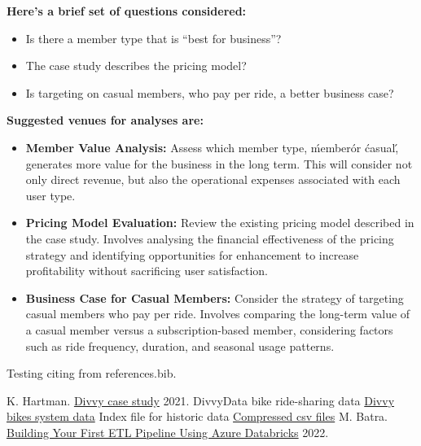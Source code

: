 \documentclass[12pt, a4paper]{article}
\begin{document}
    \textbf{Here's a brief set of questions considered:}
    \begin{itemize}
        \item Is there a member type that is “best for business”?
        \item The case study describes the pricing model?
        \item Is targeting on casual members, who pay per ride, a better business case?
    \end{itemize}
    \textbf{Suggested venues for analyses are:}
    \begin{itemize}
        \item \textbf{Member Value Analysis:} Assess which member type, \'member\' or \'casual\', generates more value for the business in the long term. This will consider not only direct revenue, but also the operational expenses associated with each user type.
        \item \textbf{Pricing Model Evaluation:} Review the existing pricing model described in the case study. Involves analysing the financial effectiveness of the pricing strategy and identifying opportunities for enhancement to increase profitability without sacrificing user satisfaction.
        \item \textbf{Business Case for Casual Members:} Consider the strategy of targeting casual members who pay per ride. Involves comparing the long-term value of a casual member versus a subscription-based member, considering factors such as ride frequency, duration, and seasonal usage patterns.
    \end{itemize}
    Testing citing from references.bib\cite{DataAnalytics2023}.

    \begin{thebibliography}{9}
         K. Hartman. \href{https://artscience.blog/home/divvy-dataviz-case-study}{Divvy case study}\/  2021.
         DivvyData bike ride-sharing data \href{https://divvybikes.com/system-data}{Divvy bikes system data}\/
         Index file for historic data \href{https://divvy-tripdata.s3.amazonaws.com/index.html}{Compressed csv files}\/
         M. Batra. \href{https://app.pluralsight.com/library/courses/building-etl-pipeline-microsoft-azure-databricks/table-of-contents}{Building Your First ETL Pipeline Using Azure Databricks}\/ 2022.
    \end{thebibliography}
    \printbibliography
\end{document}
